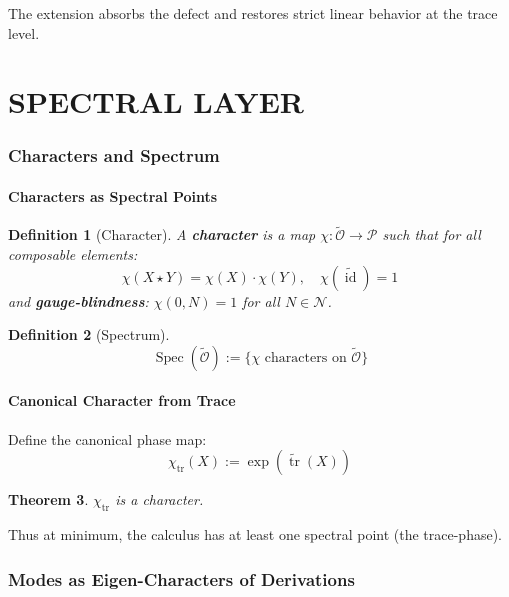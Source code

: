 \documentclass[12pt, oneside]{article}
\newtheorem{theorem}{Theorem}[section]
\newtheorem{definition}[theorem]{Definition}
\DeclareMathOperator{\id}{id}
\DeclareMathOperator{\tr}{tr}
\DeclareMathOperator{\Spec}{Spec}
\newcommand{\N}{\mathcal{N}}
\newcommand{\Opr}{\mathcal{O}}
\begin{document}
The extension absorbs the defect and restores strict linear behavior at the trace level.

\newpage

\part{SPECTRAL LAYER}

\section{Characters and Spectrum}

\subsection{Characters as Spectral Points}

\begin{definition}[Character]
A \textbf{character} is a map $\chi: \widetilde{\Opr} \rightarrow \mathcal{P}$ such that for all composable elements:
\begin{equation}
\chi(X \star Y) = \chi(X) \cdot \chi(Y), \quad \chi(\widetilde{\id}) = 1
\end{equation}
and \textbf{gauge-blindness}: $\chi(0, N) = 1$ for all $N \in \N$.
\end{definition}

\begin{definition}[Spectrum]
\begin{equation}
\Spec(\widetilde{\Opr}) := \{ \chi \text{ characters on } \widetilde{\Opr} \}
\end{equation}
\end{definition}

\subsection{Canonical Character from Trace}

Define the canonical phase map:
\begin{equation}
\chi_{\tr}(X) := \exp(\widetilde{\tr}(X))
\end{equation}

\begin{theorem}
$\chi_{\tr}$ is a character.
\end{theorem}

Thus at minimum, the calculus has at least one spectral point (the trace-phase).

\section{Modes as Eigen-Characters of Derivations}
\end{document}
